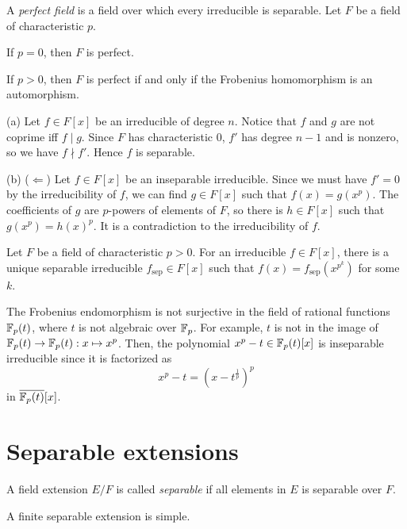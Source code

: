 \documentclass{../note}
\newcommand{\sep}{\mathrm{sep}}
\begin{document}
\begin{prb}
A \emph{perfect field} is a field over which every irreducible is separable.
Let $F$ be a field of characteristic $p$.
\begin{parts}
\item If $p=0$, then $F$ is perfect.
\item If $p>0$, then $F$ is perfect if and only if the Frobenius homomorphism is an automorphism.
\end{parts}
\end{prb}
\begin{pf}
(a)
Let $f\in F[x]$ be an irreducible of degree $n$.
Notice that $f$ and $g$ are not coprime iff $f\mid g$.
Since $F$ has characteristic 0, $f'$ has degree $n-1$ and is nonzero, so we have $f\nmid f'$.
Hence $f$ is separable.

(b)
($\Leftarrow$)
Let $f\in F[x]$ be an inseparable irreducible.
Since we must have $f'=0$ by the irreducibility of $f$, we can find $g\in F[x]$ such that $f(x)=g(x^p)$.
The coefficients of $g$ are $p$-powers of elements of $F$, so there is $h\in F[x]$ such that $g(x^p)=h(x)^p$.
It is a contradiction to the irreducibility of $f$.
\end{pf}

\begin{prop}
Let $F$ be a field of characteristic $p>0$.
For an irreducible $f\in F[x]$, there is a unique separable irreducible $f_\sep\in F[x]$ such that $f(x)=f_\sep(x^{p^k})$ for some $k$.
\end{prop}

\begin{ex}
The Frobenius endomorphism is not surjective in the field of rational functions $\mathbb{F}_p(t)$, where $t$ is not algebraic over $\mathbb{F}_p$.
For example, $t$ is not in the image of $\mathbb{F}_p(t)\to\mathbb{F}_p(t):x\mapsto x^p$.
Then, the polynomial $x^p-t\in\mathbb{F}_p(t)[x]$ is inseparable irreducible since it is factorized as
\[x^p-t=(x-t^{\frac1p})^p\]
in $\overline{\mathbb{F}_p(t)}[x]$.
\end{ex}

\section{Separable extensions}
\begin{defn}
A field extension $E/F$ is called \emph{separable} if all elements in $E$ is separable over $F$.
\end{defn}

\begin{thm}
A finite separable extension is simple.
\end{thm}
\end{document}
